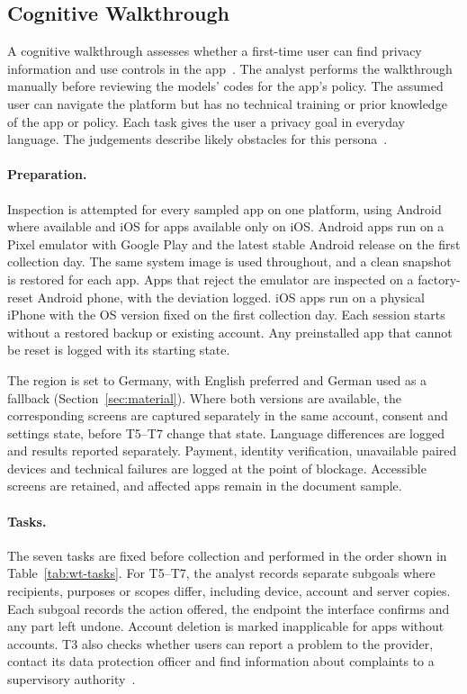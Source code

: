 \subsection{Cognitive Walkthrough}
\label{sec:walkthroughs}
A cognitive walkthrough assesses whether a first-time user can find privacy information and use
controls in the app~\parencite{wharton1994cognitive}. The analyst performs the walkthrough
manually before reviewing the models' codes for the app's policy. The assumed user can navigate
the platform but has no technical training or prior knowledge of the app or policy. Each task
gives the user a privacy goal in everyday language. The judgements describe likely obstacles for
this persona~\parencite{mahatody2010state,malki2024exploring,wharton1994cognitive}.

\paragraph{Preparation.} Inspection is attempted for every sampled app on one platform, using
Android where available and iOS for apps available only on iOS. Android apps run on a Pixel
emulator with Google Play and the latest stable Android release on the first collection day.
The same system image is used throughout, and a clean snapshot is restored for each app. Apps
that reject the emulator are inspected on a factory-reset Android phone, with the deviation
logged. iOS apps run on a physical iPhone with the OS version fixed on the first collection day.
Each session starts without a restored backup or existing account. Any preinstalled app that
cannot be reset is logged with its starting state.

The region is set to Germany, with English preferred and German used as a fallback
(Section~\ref{sec:material}). Where both versions are available, the corresponding screens are
captured separately in the same account, consent and settings state, before T5--T7 change that
state. Language differences are logged and results reported separately. Payment, identity
verification, unavailable paired devices and technical failures are logged at the point of
blockage. Accessible screens are retained, and affected apps remain in the document sample.

\paragraph{Tasks.} The seven tasks are fixed before collection and performed in the order shown
in Table~\ref{tab:wt-tasks}. For T5--T7, the analyst records separate subgoals where
recipients, purposes or scopes differ, including device, account and server copies. Each
subgoal records the action offered, the endpoint the interface confirms and any part left
undone. Account deletion is marked inapplicable for apps without accounts. T3 also checks
whether users can report a problem to the provider, contact its data protection officer and
find information about complaints to a supervisory
authority~\parencite[Art.~13(1)(b), 13(2)(d), 77]{gdpr2016}.

